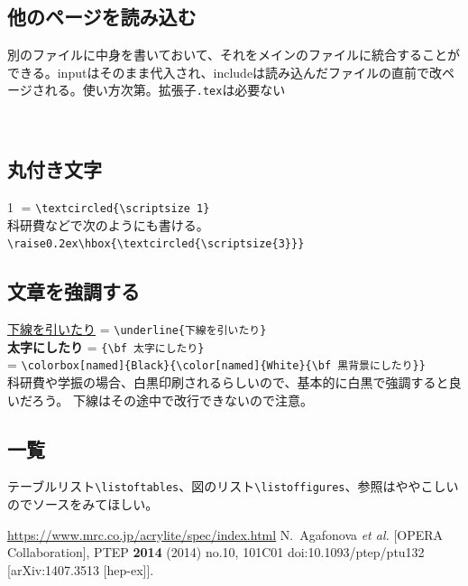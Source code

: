 \documentclass[a4j]{jsarticle}
\begin{document}
\subsection{他のページを読み込む}
別のファイルに中身を書いておいて、それをメインのファイルに統合することができる。inputはそのまま代入され、includeは読み込んだファイルの直前で改ページされる。使い方次第。拡張子\verb|.tex|は必要ない
\begin{verbatim}


\end{verbatim}

\subsection{丸付き文字}
\textcircled{\scriptsize 1} = \verb|\textcircled{\scriptsize 1}|\\
科研費などで次のようにも書ける。\verb|\raise0.2ex\hbox{\textcircled{\scriptsize{3}}}|

\subsection{文章を強調する}
\noindent
\underline{下線を引いたり} = \verb|\underline{下線を引いたり}|\\
{\bf 太字にしたり} = \verb|{\bf 太字にしたり}|\\
\colorbox[named]{Black}{\color[named]{White}{\bf 黒背景にしたり}} = \verb|\colorbox[named]{Black}{\color[named]{White}{\bf 黒背景にしたり}}|\\
科研費や学振の場合、白黒印刷されるらしいので、基本的に白黒で強調すると良いだろう。 下線はその途中で改行できないので注意。

\subsection{一覧}
テーブルリスト\verb|\listoftables|、図のリスト\verb|\listoffigures|、参照はややこしいのでソースをみてほしい。
\listoftables %
\listoffigures %

\begin{thebibliography}{99}
\url{https://www.mrc.co.jp/acrylite/spec/index.html}
  N.~Agafonova {\it et al.} [OPERA Collaboration],
  PTEP {\bf 2014} (2014) no.10,  101C01
  doi:10.1093/ptep/ptu132
  [arXiv:1407.3513 [hep-ex]].
\end{thebibliography}
\end{document}

